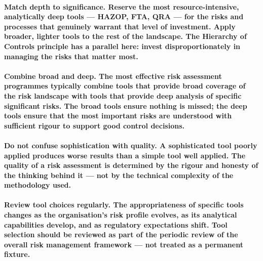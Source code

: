 \paragraph{\textbf{Match depth to significance}. Reserve the most resource-intensive, analytically deep tools — HAZOP, FTA, QRA — for the risks and processes that genuinely warrant that level of investment. Apply broader, lighter tools to the rest of the landscape. The Hierarchy of Controls principle has a parallel here: invest disproportionately in managing the risks that matter most.}
\paragraph{\textbf{Combine broad and deep}. The most effective risk assessment programmes typically combine tools that provide broad coverage of the risk landscape with tools that provide deep analysis of specific significant risks. The broad tools ensure nothing is missed; the deep tools ensure that the most important risks are understood with sufficient rigour to support good control decisions.}
\paragraph{\textbf{Do not confuse sophistication with quality}. A sophisticated tool poorly applied produces worse results than a simple tool well applied. The quality of a risk assessment is determined by the rigour and honesty of the thinking behind it — not by the technical complexity of the methodology used.}
\paragraph{\textbf{Review tool choices regularly}. The appropriateness of specific tools changes as the organisation's risk profile evolves, as its analytical capabilities develop, and as regulatory expectations shift. Tool selection should be reviewed as part of the periodic review of the overall risk management framework — not treated as a permanent fixture.}

\newpage
